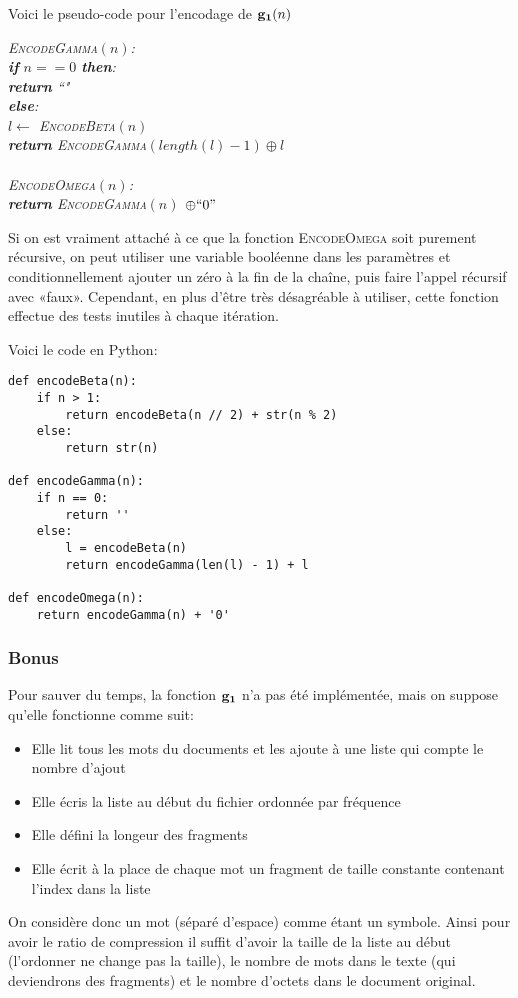 \documentclass{article}
\newenvironment{pseudo}{\begin{tcolorbox}[left skip = 2cm, right skip = 2cm]\itshape}{\end{tcolorbox}}
\newcommand{\key}[1]{{\bf #1}}
\newcommand{\name}[1]{{\scshape #1}}
\newcommand\tab[1][0.5cm]{\hspace*{#1}}
\begin{document}
\subsubsection{}
Voici le pseudo-code pour l'encodage de $\key{g_1}(n)$
\begin{pseudo}
  \name{EncodeGamma}$(n)$:\\
  \tab{} \key{if} $n == 0$ \key{then}:\\
  \tab{}\tab{} \key{return} ``"\\
  \tab{} \key{else}:\\
  \tab{}\tab{} $l \leftarrow$ \name{EncodeBeta}$(n)$\\
  \tab{}\tab{} \key{return} \name{EncodeGamma}$(length(l) - 1) \oplus l$\\\\
  
  \name{EncodeOmega}$(n)$:\\
  \tab{} \key{return} \name{EncodeGamma}$(n)$ $\oplus ``0"$
\end{pseudo}
Si on est vraiment attaché à ce que la fonction \name{EncodeOmega} soit purement récursive, on peut utiliser une variable booléenne dans les paramètres et conditionnellement ajouter un zéro à la fin de la chaîne, puis faire l'appel récursif avec «faux». Cependant, en plus d'être très désagréable à utiliser, cette fonction effectue des tests inutiles à chaque itération.

\pagebreak
Voici le code en Python:
\begin{lstlisting}
def encodeBeta(n):
	if n > 1:
		return encodeBeta(n // 2) + str(n % 2)
	else:
		return str(n)

def encodeGamma(n):
	if n == 0:
		return ''
	else:
		l = encodeBeta(n)
		return encodeGamma(len(l) - 1) + l

def encodeOmega(n):
	return encodeGamma(n) + '0'
\end{lstlisting}

\subsubsection{Bonus}
Pour sauver du temps, la fonction $\key{g_1}$ n'a pas été implémentée, mais on suppose qu'elle fonctionne comme suit:
\begin{itemize}
\item Elle lit tous les mots du documents et les ajoute à une liste qui compte le nombre d'ajout
\item Elle écris la liste au début du fichier ordonnée par fréquence
\item Elle défini la longeur des fragments
\item Elle écrit à la place de chaque mot un fragment de taille constante contenant l'index dans la liste
\end{itemize}
On considère donc un mot (séparé d'espace) comme étant un symbole. Ainsi pour avoir le ratio de compression il suffit d'avoir la taille de la liste au début (l'ordonner ne change pas la taille), le nombre de mots dans le texte (qui deviendrons des fragments) et le nombre d'octets dans le document original.
\end{document}
